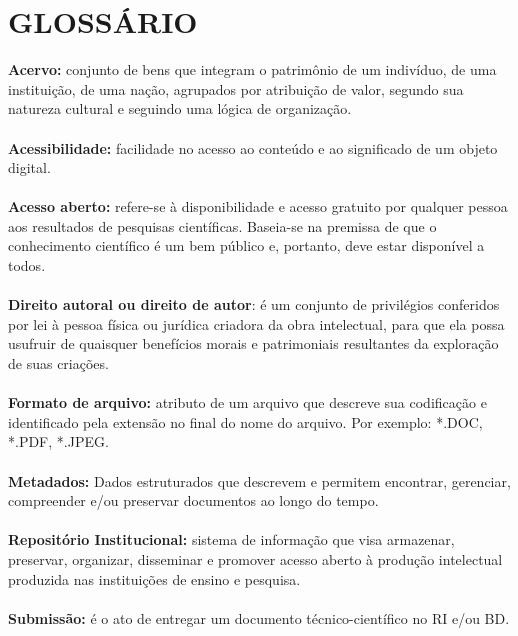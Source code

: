 
%


\clearpage
\chapter*{GLOSSÁRIO}  

\noindent\textbf{Acervo:} conjunto de bens que integram o patrimônio de um indivíduo, de uma instituição, de uma nação, agrupados por atribuição de valor, segundo sua natureza cultural e seguindo uma lógica de organização.\\ \\
\textbf{Acessibilidade:} facilidade no acesso ao conteúdo e ao significado de um objeto digital.\\ \\
\textbf{Acesso aberto:}  refere-se à disponibilidade e acesso gratuito por qualquer pessoa aos resultados de pesquisas científicas. Baseia-se na premissa de que o conhecimento científico é um bem público e, portanto, deve estar disponível a todos.\\ \\
\textbf {Direito autoral ou direito de autor}: é um conjunto de privilégios conferidos por lei à pessoa física ou jurídica criadora da obra intelectual, para que ela possa usufruir de quaisquer benefícios morais e patrimoniais resultantes da exploração de suas criações.\\ \\
\textbf {Formato de arquivo:} atributo de um arquivo que descreve sua codificação e identificado pela extensão no final do nome do arquivo. Por exemplo: *.DOC, *.PDF, *.JPEG.\\ \\
\textbf {Metadados:} Dados estruturados que descrevem e permitem encontrar, gerenciar, compreender e/ou preservar documentos ao longo do tempo.\\ \\
\textbf {Repositório Institucional:} sistema de informação que visa armazenar, preservar, organizar, disseminar e promover acesso aberto à produção intelectual produzida nas instituições de ensino e pesquisa.\\ \\
\textbf {Submissão:} é o ato de entregar um documento técnico-científico no RI e/ou BD.


